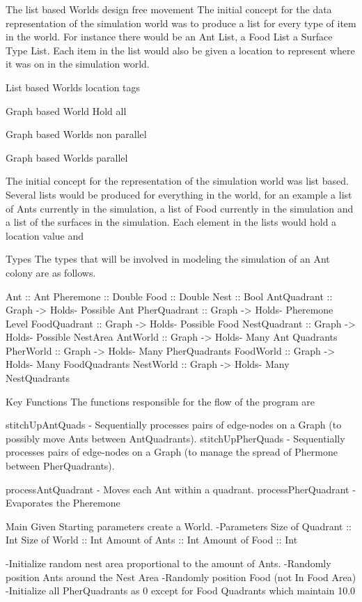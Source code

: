 \documentclass[main.tex]{subfiles}
\begin{document}
The list based Worlds design free movement
The  initial concept for the data representation of the simulation world was to produce a list for every type of item in the world. For instance there would be an Ant List, a Food List a Surface Type List. Each item in the list would also be given a location to represent where it was on in the simulation world. ‎

List based Worlds location tags

Graph based World Hold all

Graph based Worlds non parallel

Graph based Worlds parallel





The initial concept for the representation of the simulation world was list based. Several lists would be produced for everything in the world, for an example a list of Ants currently in the simulation, a list of Food currently in the simulation and a list of the surfaces in the simulation. Each element in the lists would hold a location value and 



Types
The types that will be involved in modeling the simulation of an Ant colony are as follows.

Ant          :: Ant
Pheremone    :: Double
Food         :: Double
Nest         :: Bool
AntQuadrant  :: Graph -> Holds- Possible Ant
PherQuadrant :: Graph -> Holds- Pheremone Level
FoodQuadrant :: Graph -> Holds- Possible Food
NestQuadrant :: Graph -> Holds- Possible NestArea
AntWorld     :: Graph -> Holds- Many Ant Quadrants
PherWorld    :: Graph -> Holds- Many PherQuadrants
FoodWorld    :: Graph -> Holds- Many FoodQuadrants
NestWorld    :: Graph -> Holds- Many NestQuadrants

Key Functions
The functions responsible for the flow of the program are

stitchUpAntQuads - Sequentially processes pairs of edge-nodes on a Graph (to possibly move Ants between AntQuadrants).
stitchUpPherQuads - Sequentially processes pairs of edge-nodes on a Graph (to manage the spread of Phermone between PherQuadrants).

processAntQuadrant - Moves each Ant within a quadrant.
processPherQuadrant - Evaporates the Pheremone 


Main
Given Starting parameters create a World.
-Parameters
Size of Quadrant :: Int
Size of World :: Int
Amount of Ants :: Int
Amount of Food :: Int

-Initialize random nest area proportional to the amount of Ants.
-Randomly position Ants around the Nest Area
-Randomly position Food (not In Food Area)
-Initialize all PherQuadrants as 0 except for Food Quadrants which maintain 10.0
\end{document}
